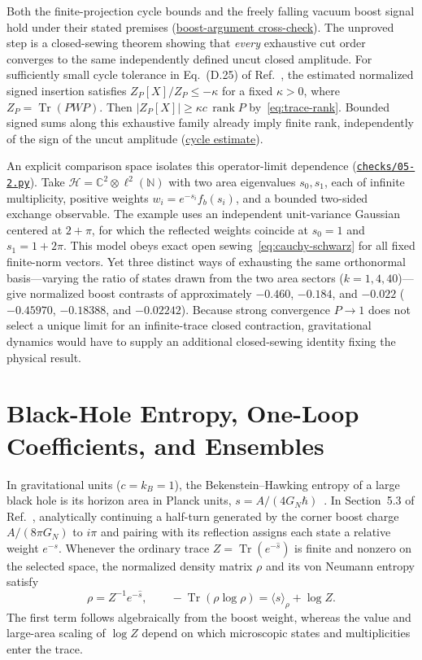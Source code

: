 \documentclass[10pt,a4paper]{article}
\numberwithin{equation}{section}
\newcommand{\repo}[2]{\href{https://github.com/sprajs/quantum-gravity/blob/main/#1}{#2}}
\newcommand{\tr}{\operatorname{Tr}}
\newcommand{\rank}{\operatorname{rank}}
\newcommand{\HH}{\mathcal{H}}
\begin{document}
Both the finite-projection cycle bounds and the freely falling vacuum boost signal hold under their stated premises (\repo{audit/dimension-crosscheck.md}{boost-argument cross-check}).
The unproved step is a closed-sewing theorem showing that \emph{every} exhaustive cut order converges to the same independently defined uncut closed amplitude.
For sufficiently small cycle tolerance in Eq.~(D.25) of Ref.~\cite{Chandrasekaran2026}, the estimated normalized signed insertion satisfies $Z_P[X]/Z_P\leq-\kappa$ for a fixed $\kappa>0$, where $Z_P=\tr(PWP)$. Then $|Z_P[X]|\geq\kappa c\,\rank P$ by~\eqref{eq:trace-rank}. Bounded signed sums along this exhaustive family already imply finite rank, independently of the sign of the uncut amplitude (\repo{reviews/fable-clock-sewing.md}{cycle estimate}).

An explicit comparison space isolates this operator-limit dependence (\repo{checks/05-2.py}{\texttt{checks/05-2.py}}).
Take $\HH = \mathbb{C}^2\otimes \ell^2(\mathbb{N})$ with two area eigenvalues $s_0,s_1$, each of infinite multiplicity, positive weights $w_i=e^{-s_i}f_b(s_i)$, and a bounded two-sided exchange observable. The example uses an independent unit-variance Gaussian centered at $2+\pi$, for which the reflected weights coincide at $s_0=1$ and $s_1=1+2\pi$.
This model obeys exact open sewing~\eqref{eq:cauchy-schwarz} for all fixed finite-norm vectors.
Yet three distinct ways of exhausting the same orthonormal basis---varying the ratio of states drawn from the two area sectors ($k=1,4,40$)---give normalized boost contrasts of approximately $-0.460$, $-0.184$, and $-0.022$ ($-0.45970$, $-0.18388$, and $-0.02242$).
Because strong convergence $P\to 1$ does not select a unique limit for an infinite-trace closed contraction, gravitational dynamics would have to supply an additional closed-sewing identity fixing the physical result.

\section{Black-Hole Entropy, One-Loop Coefficients, and Ensembles}
\label{sec:entropy}

In gravitational units ($c=k_B=1$), the Bekenstein--Hawking entropy of a large black hole is its horizon area in Planck units, $s=A/(4G_N\hbar)$~\cite{Bekenstein1973,Hawking1975}.
In Section~5.3 of Ref.~\cite{Chandrasekaran2026}, analytically continuing a half-turn generated by the corner boost charge $A/(8\pi G_N)$ to $i\pi$ and pairing with its reflection assigns each state a relative weight $e^{-s}$.
Whenever the ordinary trace $Z=\tr(e^{-\hat{s}})$ is finite and nonzero on the selected space, the normalized density matrix $\rho$ and its von Neumann entropy satisfy
\begin{equation}
  \rho = Z^{-1}e^{-\hat{s}}, \qquad
  -\tr(\rho\log\rho) = \langle s\rangle_\rho + \log Z.
  \label{eq:entropy-id}
\end{equation}
The first term follows algebraically from the boost weight, whereas the value and large-area scaling of $\log Z$ depend on which microscopic states and multiplicities enter the trace.
\end{document}
